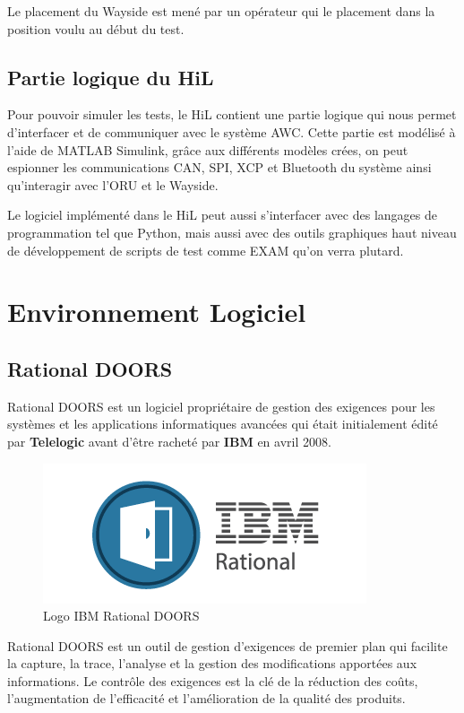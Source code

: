 Le placement du Wayside est mené par un opérateur qui le placement dans la position voulu au début du test.

\subsection{Partie logique du HiL}

Pour pouvoir simuler les tests, le HiL contient une partie logique qui nous permet d’interfacer et de communiquer avec le système AWC. Cette partie est modélisé à l’aide de MATLAB Simulink, grâce aux différents modèles crées, on peut espionner les communications CAN, SPI, XCP et Bluetooth du système ainsi qu’interagir avec l’ORU et le Wayside.

Le logiciel implémenté dans le HiL peut aussi s'interfacer avec des langages de programmation tel que Python, mais aussi avec des outils graphiques haut niveau de développement de scripts de test comme EXAM qu'on verra plutard.

\section{Environnement Logiciel}
\subsection{Rational DOORS}

Rational DOORS est un logiciel propriétaire de gestion des exigences pour les systèmes et les applications informatiques avancées qui était initialement édité par \textbf{Telelogic} avant d'être racheté par \textbf{IBM} en avril 2008.

\begin{figure}[H]
 \centering
 \includegraphics[scale=1]{images/ibm_doors_logo}
 \caption{Logo IBM Rational DOORS}
\end{figure}

Rational DOORS est un outil de gestion d'exigences de premier plan qui facilite la capture, la trace, l'analyse et la gestion des modifications apportées aux informations. Le contrôle des exigences est la clé de la réduction des coûts, l'augmentation de l'efficacité et l'amélioration de la qualité des produits.


